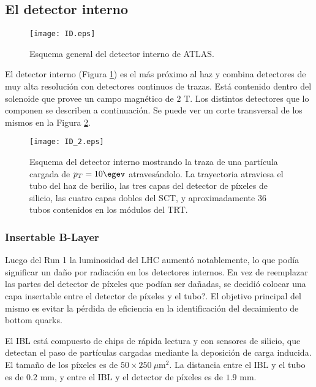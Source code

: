 \subsection{El detector interno}

\begin{figure}
\centering
\texttt{[image: ID.eps]}
\caption{Esquema general del detector interno de ATLAS.}
\label{ID}
\end{figure}

El detector interno (Figura \ref{ID}) es el más próximo al haz y combina detectores de muy alta resolución con detectores continuos de trazas. Está contenido dentro del solenoide que provee un campo magnético de $2$ T. Los distintos detectores que lo componen se describen a continuación. Se puede ver un corte transversal de los mismos en la Figura \ref{ID_2}.

\begin{figure}
\centering
\texttt{[image: ID\_2.eps]}
\caption{Esquema del detector interno mostrando la traza de una partícula cargada de $p_{T}=10 \egev$ atravesándolo. La trayectoria atraviesa el tubo del haz de  berilio, las tres capas del detector de píxeles de silicio, las cuatro capas dobles del SCT, y aproximadamente 36 tubos contenidos en los módulos del TRT.}
\label{ID_2}
\end{figure}
\vspace{0.5cm}

\subsubsection{Insertable B-Layer}

Luego del Run 1 la luminosidad del LHC aumentó notablemente, lo que podía significar un daño por radiación en los detectores internos. En vez de reemplazar las partes del detector de píxeles que podían ser dañadas, se decidió colocar una capa insertable entre el detector de píxeles y el tubo?. El objetivo principal del mismo es evitar la pérdida de eficiencia en la identificación del decaimiento de bottom quarks.

El IBL está compuesto de chips de rápida lectura y con sensores de silicio, que detectan el paso de partículas cargadas mediante la deposición de carga inducida. El tamaño de los píxeles es de $50\times250\:\mu$m$^{2}$. La distancia entre el IBL y el tubo es de $0.2$ mm, y entre el IBL y el detector de píxeles es de $1.9$ mm. 

